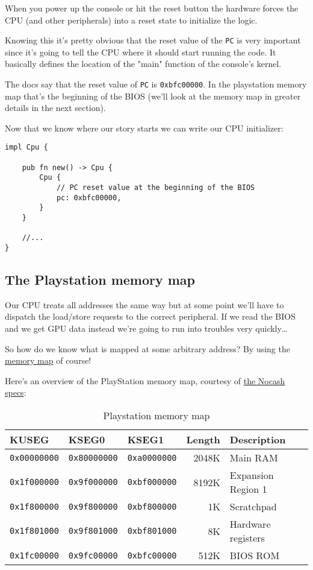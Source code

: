 \documentclass{article}
\begin{document}
When you power up the console or hit the reset button the hardware
forces the CPU (and other peripherals) into a reset state to
initialize the logic.

Knowing this it's pretty obvious that the reset value of the
\texttt{PC} is very important since it's going to tell the CPU where
it should start running the code. It basically defines the location of
the "main" function of the console's kernel.

The docs say that the reset value of \texttt{PC} is
\texttt{0xbfc00000}. In the playstation memory map that's the
beginning of the BIOS (we'll look at the memory map in greater details
in the next section).

Now that we know where our story starts we can write our CPU
initializer:

\begin{lstlisting}
impl Cpu {

    pub fn new() -> Cpu {
     	Cpu {
            // PC reset value at the beginning of the BIOS
            pc: 0xbfc00000,
        }
    }

    //...
}
\end{lstlisting}

\subsection{The Playstation memory map}

Our CPU treats all addresses the same way but at some point we'll have
to dispatch the load/store requests to the correct peripheral. If we
read the BIOS and we get GPU data instead we're going to run into
troubles very quickly\ldots{}

So how do we know what is mapped at some arbitrary address? By using
the \href{https://en.wikipedia.org/wiki/Memory_map}{memory map} of
course!

Here's an overview of the PlayStation memory map, courtesy of
\href{http://problemkaputt.de/psx-spx.htm#cpuspecifications}{the Nocash
  specs}:

\begin{table}[ht]
  \centering

  \begin{tabular}{ l | l | l | r | l }
    KUSEG & KSEG0 & KSEG1 & Length & Description \\
    \hline
    \texttt{0x00000000} & \texttt{0x80000000} & \texttt{0xa0000000} & 2048K
     & Main RAM \\
    \texttt{0x1f000000} & \texttt{0x9f000000} & \texttt{0xbf000000} & 8192K
     & Expansion Region 1 \\
    \texttt{0x1f800000} & \texttt{0x9f800000} & \texttt{0xbf800000} &    1K
     & Scratchpad \\
    \texttt{0x1f801000} & \texttt{0x9f801000} & \texttt{0xbf801000} &    8K
     & Hardware registers \\
    \texttt{0x1fc00000} & \texttt{0x9fc00000} & \texttt{0xbfc00000} &  512K
     & BIOS ROM \\
  \end{tabular}

  \caption{Playstation memory map}
  \label{tab:mmap}
\end{table}
\end{document}
